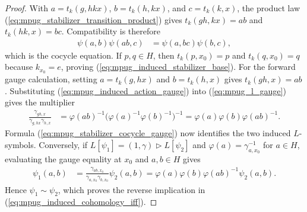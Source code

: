 \begin{proof}\leanok
    With
    $a=t_k(g,hkx)$, $b=t_k(h,kx)$, and $c=t_k(k,x)$,
    the product law (\ref{eq:mpug_stabilizer_transition_product}) gives
    $t_k(gh,kx)=ab$ and $t_k(hk,x)=bc$. Compatibility is therefore
    \begin{align}
        \psi(a,b)\psi(ab,c)
         & =\psi(a,bc)\psi(b,c),
    \end{align}
    which is the cocycle equation. If $p,q\in H$, then
    $t_k(p,x_0)=p$ and $t_k(q,x_0)=q$ because $k_{x_0}=e$, proving
    (\ref{eq:mpug_induced_stabilizer_base}). For the forward gauge
    calculation, setting $a=t_k(g,hx)$ and $b=t_k(h,x)$ gives
    $t_k(gh,x)=ab$. Substituting (\ref{eq:mpug_induced_action_gauge}) into
    (\ref{eq:mpug_l_gauge}) gives the multiplier
    \begin{align}
        \frac{\gamma_{gh,x}}{\gamma_{g,hx}\gamma_{h,x}}
         & =\varphi(ab)^{-1}
        \bigl(\varphi(a)^{-1}\varphi(b)^{-1}\bigr)^{-1}
        =\varphi(a)\varphi(b)\varphi(ab)^{-1}.
    \end{align}
    Formula (\ref{eq:mpug_stabilizer_cocycle_gauge}) now identifies the two
    induced $L$-symbols. Conversely, if
    $L[\psi_1]=(1,\gamma)\mathbin{\triangleright}L[\psi_2]$ and
    $\varphi(a)=\gamma_{a,x_0}^{-1}$ for $a\in H$, evaluating the gauge
    equality at $x_0$ and $a,b\in H$ gives
    \begin{align}
        \psi_1(a,b)
         & =\frac{\gamma_{ab,x_0}}
        {\gamma_{a,x_0}\gamma_{b,x_0}}\psi_2(a,b)
        =\varphi(a)\varphi(b)\varphi(ab)^{-1}\psi_2(a,b).
    \end{align}
    Hence $\psi_1\sim\psi_2$, which proves the reverse implication in
    (\ref{eq:mpug_induced_cohomology_iff}).
\end{proof}

